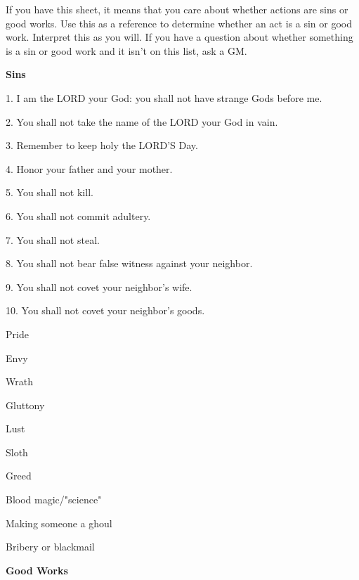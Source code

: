 \documentclass[green]{guildcamp4}
\begin{document}
\name{\gSins{}}

If you have this sheet, it means that you care about whether actions are sins or good works. Use this as a reference to determine whether an act is a sin or good work. Interpret this as you will. If you have a question about whether something is a sin or good work and it isn't on this list, ask a GM.

\begin{center}{\bf Sins}\end{center}

\begin{itemz}
	\item 1. I am the LORD your God: you shall not have strange Gods before me.
	\item 2. You shall not take the name of the LORD your God in vain.
	\item 3. Remember to keep holy the LORD'S Day.
	\item 4. Honor your father and your mother.
	\item 5. You shall not kill.
	\item 6. You shall not commit adultery.
	\item 7. You shall not steal.
	\item 8. You shall not bear false witness against your neighbor.
	\item 9. You shall not covet your neighbor's wife.
	\item 10. You shall not covet your neighbor's goods.
\end{itemz}

\begin{itemz}
	\item Pride
	\item Envy
	\item Wrath
	\item Gluttony
	\item Lust
	\item Sloth
	\item Greed
\end{itemz}

\begin{itemz}
	\item Blood magic/"science"
	\item Making someone a ghoul
	\item Bribery or blackmail
\end{itemz}

\begin{center}{\bf Good Works}\end{center}
\end{document}
